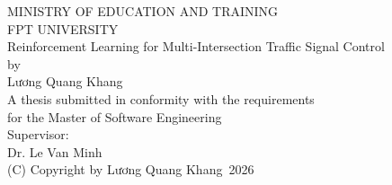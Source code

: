 \documentclass[12pt]{report} %
\newcommand{\thesistitle}{	
Reinforcement Learning for Multi-Intersection Traffic Signal Control}
\newcommand{\authorname}{Lương Quang Khang}
\newcommand{\supervisorone}{Dr. Le Van Minh}
\newcommand{\yearofconvocation}{2026}
\begin{document}
\begin{titlepage}
\thispagestyle{empty}
\begin{center}
{\large MINISTRY OF EDUCATION AND TRAINING}\\
{\large FPT UNIVERSITY}\\
\vspace{2cm}
{\LARGE \thesistitle}\\
\vspace{1cm}
by\\
{\large \authorname}\\
\vspace{1cm}
A thesis submitted in conformity with the requirements\\
for the Master of Software Engineering\\
\vspace{1cm}
Supervisor:\\
\supervisorone\\
\vspace{2cm}
(C) Copyright by \authorname\ \yearofconvocation\\
\end{center}
\end{titlepage}
\end{document}
